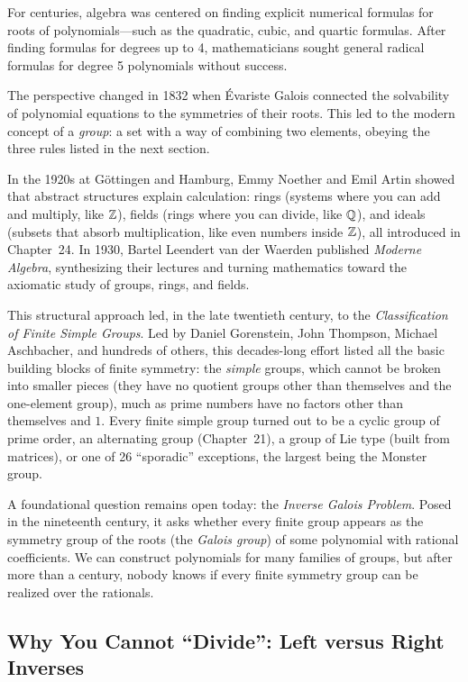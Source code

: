 \begin{historybox}
For centuries, algebra was centered on finding explicit numerical formulas for roots of polynomials---such as the quadratic, cubic, and quartic formulas. After finding formulas for degrees up to 4, mathematicians sought general radical formulas for degree 5 polynomials without success.

The perspective changed in 1832 when \'Evariste Galois connected the solvability of polynomial equations to the symmetries of their roots. This led to the modern concept of a \emph{group}: a set with a way of combining two elements, obeying the three rules listed in the next section.

In the 1920s at G\"ottingen and Hamburg, Emmy Noether and Emil Artin showed that abstract structures explain calculation: rings (systems where you can add and multiply, like $\mathbb{Z}$), fields (rings where you can divide, like $\mathbb{Q}$), and ideals (subsets that absorb multiplication, like even numbers inside $\mathbb{Z}$), all introduced in Chapter~24. In 1930, Bartel Leendert van der Waerden published \emph{Moderne Algebra}, synthesizing their lectures and turning mathematics toward the axiomatic study of groups, rings, and fields.

This structural approach led, in the late twentieth century, to the \emph{Classification of Finite Simple Groups}. Led by Daniel Gorenstein, John Thompson, Michael Aschbacher, and hundreds of others, this decades-long effort listed all the basic building blocks of finite symmetry: the \emph{simple} groups, which cannot be broken into smaller pieces (they have no quotient groups other than themselves and the one-element group), much as prime numbers have no factors other than themselves and $1$. Every finite simple group turned out to be a cyclic group of prime order, an alternating group (Chapter~21), a group of Lie type (built from matrices), or one of 26 ``sporadic'' exceptions, the largest being the Monster group.

A foundational question remains open today: the \emph{Inverse Galois Problem}. Posed in the nineteenth century, it asks whether every finite group appears as the symmetry group of the roots (the \emph{Galois group}) of some polynomial with rational coefficients. We can construct polynomials for many families of groups, but after more than a century, nobody knows if every finite symmetry group can be realized over the rationals.
\end{historybox}

\subsection{Why You Cannot ``Divide'': Left versus Right Inverses}

